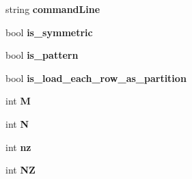 \begin{DoxyCompactItemize}
\item 
\hypertarget{classConfiguration_ad9b3d3735ae57b036dcc841ebe11f23f}{
string {\bfseries commandLine}}
\label{classConfiguration_ad9b3d3735ae57b036dcc841ebe11f23f}

\item 
\hypertarget{classConfiguration_ae1c91512831b6c5fcdb67e1bb788b560}{
bool {\bfseries is\_\-symmetric}}
\label{classConfiguration_ae1c91512831b6c5fcdb67e1bb788b560}

\item 
\hypertarget{classConfiguration_a7efb05042deafcc6cdad146b4a5d15ef}{
bool {\bfseries is\_\-pattern}}
\label{classConfiguration_a7efb05042deafcc6cdad146b4a5d15ef}

\item 
\hypertarget{classConfiguration_a6a7146d171b8a44c03069d3ccb8b7e9d}{
bool {\bfseries is\_\-load\_\-each\_\-row\_\-as\_\-partition}}
\label{classConfiguration_a6a7146d171b8a44c03069d3ccb8b7e9d}

\item 
\hypertarget{classConfiguration_a9db655020ed3d2752a16daef0ccce66e}{
int {\bfseries M}}
\label{classConfiguration_a9db655020ed3d2752a16daef0ccce66e}

\item 
\hypertarget{classConfiguration_af6362e29173fb6b80ce82097abb879df}{
int {\bfseries N}}
\label{classConfiguration_af6362e29173fb6b80ce82097abb879df}

\item 
\hypertarget{classConfiguration_a145b6ac832c1ad733bc709f0a99f4c4c}{
int {\bfseries nz}}
\label{classConfiguration_a145b6ac832c1ad733bc709f0a99f4c4c}

\item 
\hypertarget{classConfiguration_a81b88410b064d6cf37224fd4c743abe9}{
int {\bfseries NZ}}
\label{classConfiguration_a81b88410b064d6cf37224fd4c743abe9}

\end{DoxyCompactItemize}


